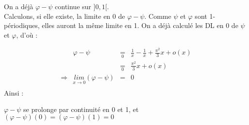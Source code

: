 On a déjà $\varphi-\psi$ continue sur $]0, 1[$.\\
Calculons, si elle existe, la limite en 0 de $ \varphi-\psi$. Comme $\psi$ et $\varphi$ sont 1-périodiques, elles auront la même limite en 1.
On a déjà calculé les DL en 0 de $\psi$ et $\varphi$, d'où :

\[
  \begin{array}{rrcl}
                & \varphi-\psi                                  & \underset{0}{=} & \frac{1}{x} - \frac{1}{x} + \frac{\pi^2}{3}x + o(x) \\
                &                                               & \underset{0}{=} & \frac{\pi^2}{3}x + o(x)                             \\
    \Rightarrow & \underset{x\rightarrow 0}{lim} (\varphi-\psi) & =               & 0                                                   \\
  \end{array}
\]
Ainsi :
\begin{result}
  $\varphi-\psi$ se prolonge par continuité en 0 et 1, et $(\varphi-\psi)(0) = (\varphi-\psi)(1) = 0$
\end{result}
